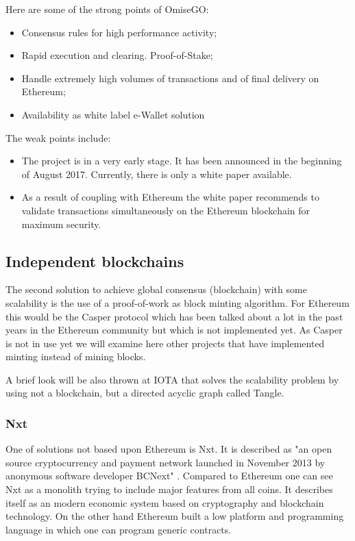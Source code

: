 Here are some of the strong points of OmiseGO:
\begin{itemize}
    \item Consensus rules for high performance activity;
    \item Rapid execution and clearing. Proof-of-Stake;
    \item Handle extremely high volumes of transactions and of final delivery on Ethereum;
    \item Availability as white label e-Wallet solution
\end{itemize}

The weak points include:

\begin{itemize}
    \item The project is in a very early stage. It has been announced in the beginning of August 2017. Currently, there is only a white paper available.
    \item As a result of coupling with Ethereum the white paper recommends to validate transactions simultaneously on the Ethereum blockchain for maximum security.
\end{itemize}

\subsection{Independent blockchains}
The second solution to achieve global consensus (blockchain) with some scalability is the use of a proof-of-work as block minting algorithm. For Ethereum this would be the Casper protocol which has been talked about a lot in the past years in the Ethereum community but which is not implemented yet. As Casper is not in use yet we will examine here other projects that have implemented minting instead of mining blocks.

A brief look will be also thrown at IOTA that solves the scalability problem by using not a blockchain, but a directed acyclic graph called Tangle.

\subsubsection{Nxt}
One of solutions not based upon Ethereum is Nxt. It is described as "an open source cryptocurrency and payment network launched in November 2013 by anonymous software developer BCNext" \cite{Nxt}. Compared to Ethereum one can see Nxt as a monolith trying to include major features from all coins. It describes itself as an modern economic system based on cryptography and blockchain technology. On the other hand Ethereum built a low platform and programming language in which one can program generic contracts.

